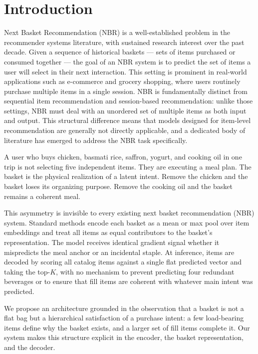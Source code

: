 \documentclass[conference]{IEEEtran}
\begin{document}
\section{Introduction}
Next Basket Recommendation (NBR) is a well-established problem in the recommender systems literature, with sustained research interest over the past decade. Given a sequence of historical baskets — sets of items purchased or consumed together — the goal of an NBR system is to predict the set of items a user will select in their next interaction. This setting is prominent in real-world applications such as e-commerce and grocery shopping, where users routinely purchase multiple items in a single session.
NBR is fundamentally distinct from sequential item recommendation and session-based recommendation: unlike those settings, NBR must deal with an unordered set of multiple items as both input and output. This structural difference means that models designed for item-level recommendation are generally not directly applicable, and a dedicated body of literature has emerged to address the NBR task specifically.

A user who buys chicken, basmati rice, saffron, yogurt, and cooking oil
in one trip is not selecting five independent items. They are executing
a meal plan. The basket is the physical realization of a latent intent.
Remove the chicken and the basket loses its organizing purpose. Remove
the cooking oil and the basket remains a coherent meal.

This asymmetry is invisible to every existing next basket recommendation
(NBR) system. Standard methods encode each basket as a mean or max pool
over item embeddings and treat all items as equal contributors to the
basket's representation. The model receives identical gradient signal
whether it mispredicts the meal anchor or an incidental staple. At
inference, items are decoded by scoring all catalog items against a
single flat predicted vector and taking the top-$K$, with no mechanism
to prevent predicting four redundant beverages or to ensure that fill
items are coherent with whatever main intent was predicted.

We propose an architecture grounded in the observation that a basket is
not a flat bag but a hierarchical satisfaction of a purchase intent:
a few load-bearing items define why the basket exists, and a larger
set of fill items complete it. Our system makes this structure explicit
in the encoder, the basket representation, and the decoder.
\end{document}
